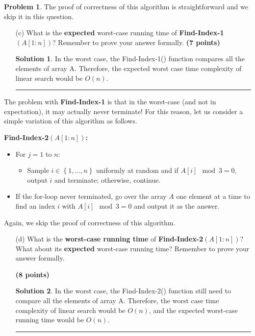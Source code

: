 \documentclass{article}
\theoremstyle{definition}
\newtheorem{problem}{Problem}
\def\fline{\rule{0.75\linewidth}{0.5pt}}
\newcommand{\finishline}{\begin{center}\fline\end{center}}
\newtheorem*{solution*}{Solution}
\newenvironment{solution}{\begin{solution*}}{{\finishline} \end{solution*}}
\newcommand{\grade}[1]{\hfill{\textbf{($\mathbf{#1}$ points)}}}
\newcommand{\set}[1]{\ensuremath{\left\{ #1 \right\}}}
\begin{document}
\begin{problem}
The proof of correctness of this algorithm is straightforward and we skip it in this question. 

\begin{enumerate}
\item[(c)] What is the \textbf{expected} worst-case running time of \textbf{Find-Index-1$(A[1:n])$}? Remember to prove your answer formally. \grade{7} 


	\begin{solution}
	
		In the worst case, the Find-Index-1() function compares all the elements of array A. Therefore, the expected worst case time complexity of linear search would be $O(n)$. \\
		
	\end{solution}
	
\end{enumerate}

The problem with \textbf{Find-Index-1} is that in the worst-case (and not in expectation), it may actually never terminate! For this reason, let us consider 
a simple variation of this algorithm as follows. 

\textbf{Find-Index-2$(A[1:n])$:} 
\begin{itemize}
	\item For $j=1$ to $n$: 
	\begin{itemize}
		\item Sample $i \in \set{1,\ldots,n}$ uniformly at random and if $A[i] \mod 3 = 0$, output $i$ and terminate; otherwise, continue. 
	\end{itemize}
	\item If the for-loop never terminated, go over the array $A$ one element at a time to find an index $i$ with $A[i] \mod 3 = 0$ and output it as the answer. 
\end{itemize}

Again, we skip the proof of correctness of this algorithm. 

\begin{enumerate}
\item[(d)] What is the \textbf{worst-case running time} of \textbf{Find-Index-2$(A[1:n])$}? What about its \textbf{expected} worst-case running time? Remember to prove your answer formally.

\grade{8} 



	\begin{solution}
		
		In the worst case, the Find-Index-2() function still need to compare all the elements of array A. Therefore, the worst case time complexity of linear search would be $O(n)$, and the expected worst-case running time would be $O(n)$. \\
		
	\end{solution}
	
\end{enumerate}

\end{problem}
\end{document}
